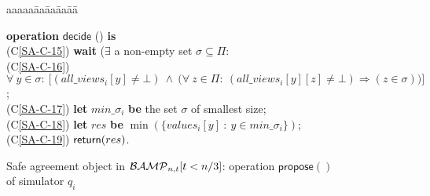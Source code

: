 \documentclass[11pt,letterpaper]{article}
\newenvironment{mycenter}{\begin{list}{}{\topsep0pt \partopsep0pt \parskip0pt \leftmargin0pt}\centering\item\relax}{\end{list}}
\newenvironment{myalgo}[1][aaaaa\=aa\=aa\=aa\=aa\=\kill]{
\begin{lrbox}{\mybox}
\footnotesize
\let\oldbaselinestretch\baselinestretch
\renewcommand{\baselinestretch}{2.5}
\begin{minipage}[t]{0pt}
\begin{tabbing}#1
}{\end{tabbing}
\end{minipage}\normalsize
\renewcommand{\baselinestretch}{\oldbaselinestretch}
\end{lrbox}
\begin{mycenter}
\fbox{\usebox{\mybox}}
\end{mycenter}
}
\newcommand{\BM}{{\cal BAMP}_{n,t}}
\begin{document}
\begin{figure}[ht!]
\begin{myalgo}
{\bf operation} $\mathsf{decide}$ () {\bf is}\\
(C\ref{SA-C-15})
\>  {\bf wait}
       \big($\exists$ a non-empty set $\sigma \subseteq \Pi$:\\

(C\ref{SA-C-16})
\> \> ~$\forall~y\in \sigma:~
       \big[ (all\_views_i[y]\neq\bot) ~\wedge~
 \big(\forall~z\in \Pi:~(all\_views_i[y][z]\neq\bot)
                               \Rightarrow(z\in \sigma)\big)\big]$;\\

(C\ref{SA-C-17})
\> {\bf let} $min\_\sigma_i$ {\bf be} the set  $\sigma$ of smallest size; \\

(C\ref{SA-C-18})
\>  {\bf let} $res$ {\bf be} $\min(\{values_i[y] ~:~ y\in min\_\sigma_i\})$;\\

(C\ref{SA-C-19})
\> ${\sf return}(res)$.
\end{myalgo}
\caption{Safe agreement object in $\BM[t<n/3]$:
operation  $\mathsf{propose}()$ of simulator $q_i$}
\label{algo-SA-msg-passing-byzantine-propose}
\end{figure}
\end{document}
